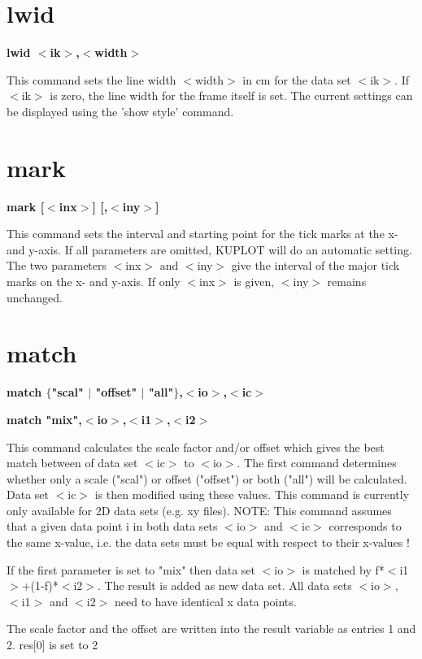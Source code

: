 \section{lwid}
{\bf lwid $ <$ik$> $,$ <$width$> $ \par }
\par
\vspace{3pt}
This command sets the line width $ <$width$> $ in cm for the data set $ <$ik$> $. 
If $ <$ik$> $ is zero, the line width for the frame itself is set. The 
current settings can be displayed using the 'show style' command. 
\section{mark}
{\bf mark [$ <$inx$> $] [,$ <$iny$> $] \par }
\par
\vspace{3pt}
This command sets the interval and starting point for the tick marks 
at the x- and y-axis. If all parameters are omitted, KUPLOT will do 
an automatic setting. The two parameters $ <$inx$> $ and $ <$iny$> $ give 
the interval of the major tick marks on the x- and y-axis. If only 
$ <$inx$> $ is given, $ <$iny$> $ remains unchanged. 
\section{match}
{\bf match $ \{$"scal" $| $ "offset" $| $ "all"$\} $,$ <$io$> $,$ <$ic$> $ \par }
{\bf match "mix",$ <$io$> $,$ <$i1$> $,$ <$i2$> $ \par }
\par
\vspace{3pt}
This command calculates the scale factor and/or offset which gives 
the best match between of data set $ <$ic$> $ to $ <$io$> $. The first command 
determines whether only a scale ("scal") or offset ("offset") or 
both ("all") will be calculated. Data set $ <$ic$> $ is then modified 
using these values. This command is currently only available for 
2D data sets (e.g. xy files). NOTE: This command assumes that a 
given data point i in both data sets $ <$io$> $ and $ <$ic$> $ corresponds to 
the same x-value, i.e. the data sets must be equal with respect to 
their x-values ! 
\par
If the first parameter is set to "mix" then data set $ <$io$> $ is matched 
by f*$ <$i1$> $+(1-f)*$ <$i2$> $. The result is added as new data set. All data 
sets $ <$io$> $, $ <$i1$> $ and $ <$i2$> $ need to have identical x data points. 
\par
The scale factor and the offset are written into the result variable 
as entries 1 and 2. res[0] is set to 2 
